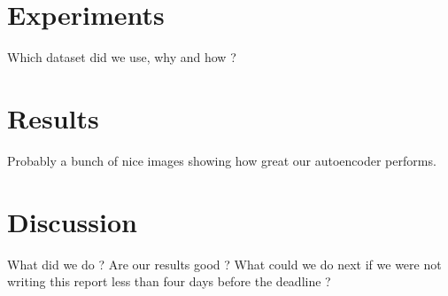 \documentclass[10pt,twocolumn,letterpaper]{article}
\begin{document}
\section{Experiments}

Which dataset did we use, why and how ?

\section{Results}

Probably a bunch of nice images showing how great our autoencoder performs.

\section{Discussion} %

What did we do ? Are our results good ? What could we do next if we were not writing this report less than four days before the deadline ?

{\small


}
\end{document}

